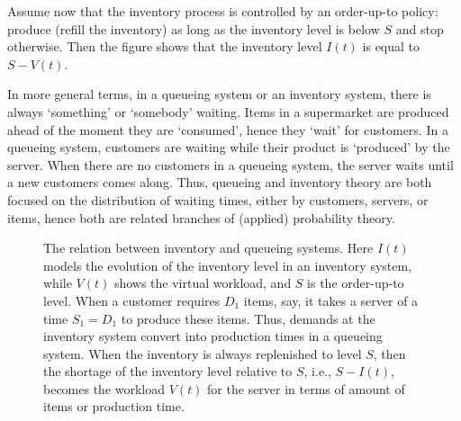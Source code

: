 Assume now that  the inventory process is controlled by an order-up-to policy: produce (refill the inventory) as long as the inventory level is below $S$ and stop otherwise.  Then the figure shows that the inventory level $I(t)$ is equal to $S-V(t)$.   

In more general terms, in a queueing system or an inventory system, there is always `something' or `somebody'  waiting. Items in a supermarket are produced ahead of the moment they are `consumed', hence they `wait' for customers. In a queueing system, customers are waiting  while their product is `produced' by the server. When there are no customers in a queueing system, the server waits until a new customers comes along. Thus, queueing and inventory theory are both focused on the distribution of waiting times, either by customers, servers, or items, hence  both are related branches of (applied) probability theory.


\begin{figure}[th]
\begin{center}
\end{center}
\caption{The relation between inventory and queueing systems. Here $I(t)$ models the evolution of the inventory level in an  inventory system, while $V(t)$ shows the virtual workload, and $S$ is the order-up-to level. When a customer requires $D_1$ items, say, it takes a server of a time $S_1=D_1$ to produce these items. Thus, demands at the inventory system convert into production times in a queueing system.  When the inventory is always replenished to level $S$, then the shortage of the inventory level relative to $S$, i.e., $S-I(t)$, becomes the workload $V(t)$ for the server in terms of amount of items or production time.} \label{fig:inv_queue}
\end{figure}


